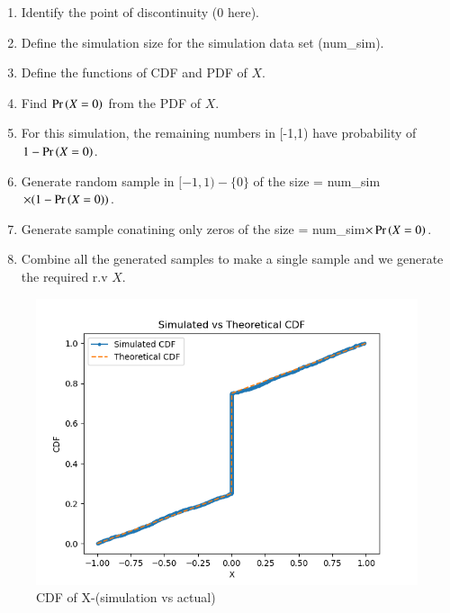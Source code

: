 \documentclass[journal,12pt,twocolumn]{IEEEtran}
\theoremstyle{remark}
\begin{document}
\begin{enumerate}
	\item Identify the point of discontinuity (0 here).
	\item Define the simulation size for the simulation data set (num\_sim).
	\item Define the functions of CDF and PDF of $X$.
	\item Find $\Pr\left(X=0\right)$ from the PDF of $X$.
	\item For this simulation, the remaining numbers in [-1,1) have probability of $1 - \Pr\left(X=0\right)$.
	\item Generate random sample in $[-1,1) - \{0\}$ of the size = num\_sim$\times(1 - \Pr\left(X=0\right))$.
	\item Generate sample conatining only zeros of the size = num\_sim$\times\Pr\left(X=0\right)$.
	\item Combine all the generated samples to make a single sample and we generate the required r.v $X$.
\end{enumerate}
\newpage
\begin{figure}
\includegraphics[width=\columnwidth]{./figs/main.png}
\caption{CDF of X-(simulation vs actual)}
\label{fig:theo_vs_sim(X)}
\end{figure}
\end{document}
